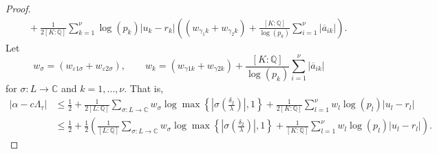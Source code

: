 \begin{proof}
\begin{align*}
	& \quad + \frac{1}{2[K:\mathbb{Q}]}\sum_{k = 1}^{\nu} \log(p_k)|u_k - r_k|\left( (w_{\gamma_1 k} + w_{\gamma_2 k}) + \frac{[K:\mathbb{Q}]}{\log(p_k)}\sum_{i=1}^{\nu}|\overline{a}_{ik}|\right).
\end{align*}
Let
\[w_{\sigma} = (w_{\varepsilon 1 \sigma} + w_{\varepsilon 2 \sigma}), \quad \quad w_k = (w_{\gamma 1 k} + w_{\gamma 2 k}) + \frac{[K:\mathbb{Q}]}{\log(p_k)}\sum_{i=1}^{\nu}|\overline{a}_{ik}|\]
for $\sigma: L \to \mathbb{C}$ and $k = 1, \dots, \nu$. That is, 
\begin{align*}
|\alpha-c\Lambda_\tau|
	& \leq \frac{1}{2} + \frac{1}{2[L:\mathbb{Q}]}\sum_{\sigma :L \to \mathbb{C}} w_{\sigma}\log \max \left\{ \left|\sigma\left(\frac{\delta_2}{\lambda}\right)\right|, 1\right\} + \frac{1}{2[K:\mathbb{Q}]}\sum_{l = 1}^{\nu}w_l \log(p_l)|u_l - r_l|\\
	& \leq \frac{1}{2} + \frac{1}{2}\left(\frac{1}{[L:\mathbb{Q}]}\sum_{\sigma :L \to \mathbb{C}} w_{\sigma}\log \max \left\{ \left|\sigma\left(\frac{\delta_2}{\lambda}\right)\right|, 1\right\} + \frac{1}{[K:\mathbb{Q}]}\sum_{l = 1}^{\nu}w_l \log(p_l)|u_l - r_l|\right).
\end{align*}


\end{proof}
